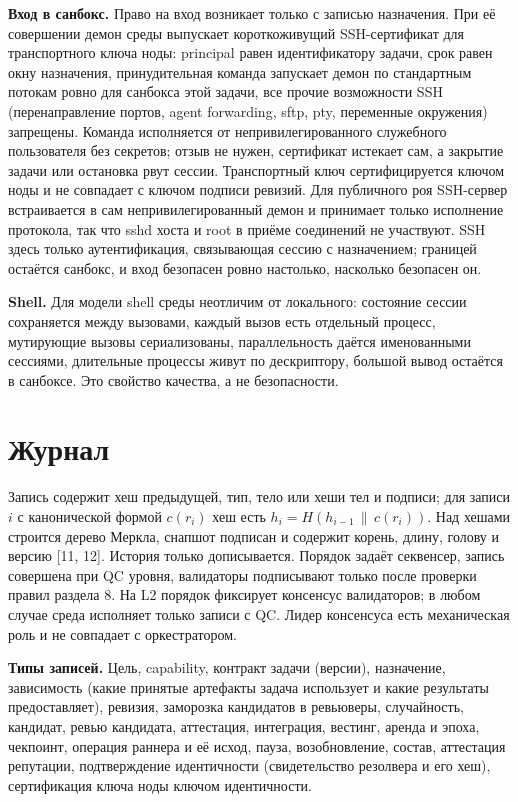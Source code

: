 \documentclass[11pt,a4paper]{article}
\begin{document}
\textbf{Вход в санбокс.} Право на вход возникает только с записью назначения. При её совершении демон среды выпускает короткоживущий SSH-сертификат для транспортного ключа ноды: principal равен идентификатору задачи, срок равен окну назначения, принудительная команда запускает демон по стандартным потокам ровно для санбокса этой задачи, все прочие возможности SSH (перенаправление портов, agent forwarding, sftp, pty, переменные окружения) запрещены. Команда исполняется от непривилегированного служебного пользователя без секретов; отзыв не нужен, сертификат истекает сам, а закрытие задачи или остановка рвут сессии. Транспортный ключ сертифицируется ключом ноды и не совпадает с ключом подписи ревизий. Для публичного роя SSH-сервер встраивается в сам непривилегированный демон и принимает только исполнение протокола, так что sshd хоста и root в приёме соединений не участвуют. SSH здесь только аутентификация, связывающая сессию с назначением; границей остаётся санбокс, и вход безопасен ровно настолько, насколько безопасен он.

\textbf{Shell.} Для модели shell среды неотличим от локального: состояние сессии сохраняется между вызовами, каждый вызов есть отдельный процесс, мутирующие вызовы сериализованы, параллельность даётся именованными сессиями, длительные процессы живут по дескриптору, большой вывод остаётся в санбоксе. Это свойство качества, а не безопасности.

\section{Журнал}

Запись содержит хеш предыдущей, тип, тело или хеши тел и подписи; для записи $i$ с канонической формой $c(r_i)$ хеш есть $h_i = H(h_{i-1} \,\|\, c(r_i))$. Над хешами строится дерево Меркла, снапшот подписан и содержит корень, длину, голову и версию [11, 12]. История только дописывается. Порядок задаёт секвенсер, запись совершена при QC уровня, валидаторы подписывают только после проверки правил раздела 8. На L2 порядок фиксирует консенсус валидаторов; в любом случае среда исполняет только записи с QC. Лидер консенсуса есть механическая роль и не совпадает с оркестратором.

\textbf{Типы записей.} Цель, capability, контракт задачи (версии), назначение, зависимость (какие принятые артефакты задача использует и какие результаты предоставляет), ревизия, заморозка кандидатов в ревьюверы, случайность, кандидат, ревью кандидата, аттестация, интеграция, вестинг, аренда и эпоха, чекпоинт, операция раннера и её исход, пауза, возобновление, состав, аттестация репутации, подтверждение идентичности (свидетельство резолвера и его хеш), сертификация ключа ноды ключом идентичности.
\end{document}
